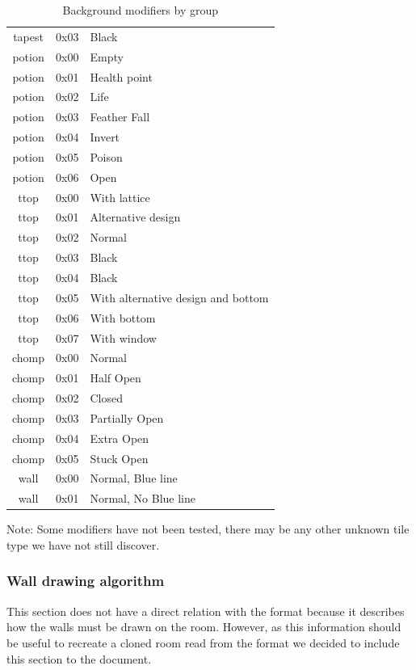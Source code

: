\documentclass{article}
\begin{document}
\begin{table}
\begin{tabular}{ccl}
 tapest & 0x03 & Black\footnotemark[2] \\
 potion & 0x00 & Empty \\
 potion & 0x01 & Health point \\
 potion & 0x02 & Life \\
 potion & 0x03 & Feather Fall \\
 potion & 0x04 & Invert \\
 potion & 0x05 & Poison \\
 potion & 0x06 & Open \\
 ttop  & 0x00 & With lattice\footnotemark[2] \\
 ttop  & 0x01 & Alternative design\footnotemark[2] \\
 ttop  & 0x02 & Normal\footnotemark[2] \\
 ttop  & 0x03 & Black\footnotemark[2] \\
 ttop  & 0x04 & Black\footnotemark[2] \\
 ttop  & 0x05 & With alternative design and bottom\footnotemark[2] \\
 ttop  & 0x06 & With bottom\footnotemark[2] \\
 ttop  & 0x07 & With window\footnotemark[2] \\
 chomp & 0x00 & Normal \\
 chomp & 0x01 & Half Open \\
 chomp & 0x02 & Closed \\
 chomp & 0x03 & Partially Open \\
 chomp & 0x04 & Extra Open \\
 chomp & 0x05 & Stuck Open \\
 wall  & 0x00 & Normal\footnotemark[1], Blue line\footnotemark[2] \\
 wall  & 0x01 & Normal\footnotemark[1], No Blue line\footnotemark[2] \\
\hline
\end{tabular}
\caption{Background modifiers by group}
\label{background modifiers}
\end{table}

 Note: Some modifiers have not been tested, there may be any other unknown
       tile type we have not still discover.


\subsubsection{Wall drawing algorithm} %
 This section does not have a direct relation with the format because it
 describes how the walls must be drawn on the room. However, as this
 information should be useful to recreate a cloned room read from the
 format we decided to include this section to the document.
\end{document}
